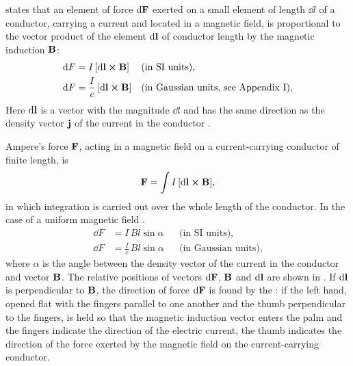  states that an element of force $\dd \vb{F}$ exerted on a small element of length $\dd l$ of a conductor, carrying a current and located in a magnetic field, is proportional to the vector product of the element $\dd \vb{l}$ of conductor length by the magnetic induction $\vb{B}$:
\begin{align*}%
\dd F & = I \, [\dd \vb{l} \cross \vb{B}] && \text{(in SI units),}\\
\dd F & = \frac{I}{c} \, [\dd \vb{l} \cross \vb{B}]&& \text{(in Gaussian units, see Appendix~I),}
\end{align*}
Here $\dd \vb{l}$ is a vector with the magnitude $\dd l$ and has the same direction as the density vector $\vb{j}$ of the current in the conductor .

Ampere's force $\vb{F}$, acting in a magnetic field on a current-carrying conductor of finite length, is
\begin{equation*}%
\vb{F} = \int I \,  [\dd \vb{l} \cross \vb{B}],
\end{equation*}
in which integration is carried out over the whole length of the conductor. In the case of a uniform magnetic field .
\begin{align*}%
\dd F & = I \, Bl \sin \alpha && \text{(in SI units),}\\
\dd F & = \frac{I}{c} \, Bl \sin \alpha && \text{(in Gaussian units),}
\end{align*}
where $\alpha$ is the angle between the density vector of the current in the conductor and vector $\vb{B}$. The relative positions of vectors $\dd \vb{F}$, $\vb{B}$ and $\dd \vb{l}$ are shown in . If $\dd \vb{l}$ is perpendicular to $\vb{B}$, the direction of force $\dd \vb{F}$ is found by the : if the left hand, opened flat with the fingers parallel to one another and the thumb perpendicular to the fingers, is held so that the magnetic induction vector enters the palm and the fingers indicate the direction of the electric current, the thumb indicates the direction of the force exerted by the magnetic field on the current-carrying conductor. 

